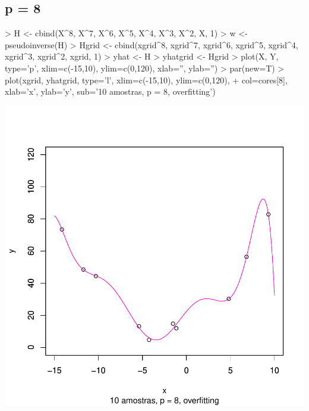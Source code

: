 \documentclass{article}
\begin{document}
\subsection{p = 8}
\begin{Schunk}
\begin{Sinput}
> H <- cbind(X^8, X^7, X^6, X^5, X^4, X^3, X^2, X, 1)
> w <- pseudoinverse(H) %
> Hgrid <- cbind(xgrid^8, xgrid^7, xgrid^6, xgrid^5, xgrid^4, xgrid^3, xgrid^2, xgrid, 1)
> yhat <- H %
> yhatgrid <- Hgrid %
> plot(X, Y, type='p', xlim=c(-15,10), ylim=c(0,120), xlab='', ylab='')
> par(new=T)
> plot(xgrid, yhatgrid, type='l', xlim=c(-15,10), ylim=c(0,120),
+      col=cores[8], xlab='x', ylab='y', sub='10 amostras, p = 8, overfitting')
\end{Sinput}
\end{Schunk}
\includegraphics{aprox-009}
\end{document}
